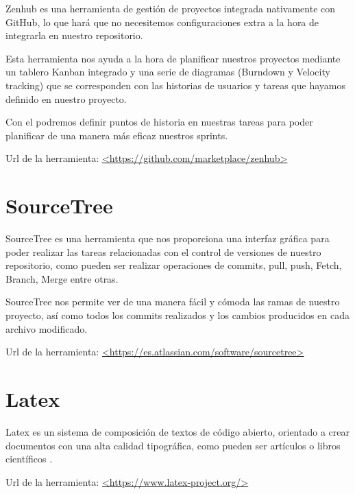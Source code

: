 Zenhub es una herramienta de gestión de proyectos integrada nativamente con GitHub, lo que hará que no necesitemos configuraciones extra a la hora de integrarla en nuestro repositorio. 

Esta herramienta nos ayuda a la hora de planificar nuestros proyectos mediante un tablero Kanban integrado y una serie de diagramas (Burndown y Velocity tracking) que se corresponden con las historias de usuarios y tareas que hayamos definido en nuestro proyecto.

Con el podremos definir puntos de historia en nuestras tareas para poder planificar de una manera más eficaz nuestros sprints.

Url de la herramienta: \url{<https://github.com/marketplace/zenhub>}

\section{SourceTree}

SourceTree es una herramienta que nos proporciona una interfaz gráfica para poder realizar las tareas relacionadas con el control de versiones de nuestro repositorio, como pueden ser realizar  operaciones de commits, pull, push, Fetch, Branch, Merge entre otras.

SourceTree nos permite ver de una manera fácil y cómoda las ramas de nuestro proyecto, así como todos los commits realizados y los cambios producidos en cada archivo modificado.

Url de la herramienta: \url{<https://es.atlassian.com/software/sourcetree>}

\section{Latex}

Latex es un sistema de composición de textos de código abierto, orientado a crear documentos con una alta calidad tipográfica, como pueden ser artículos o libros científicos \cite{wiki:Latex}.

Url de la herramienta: \url{<https://www.latex-project.org/>}



